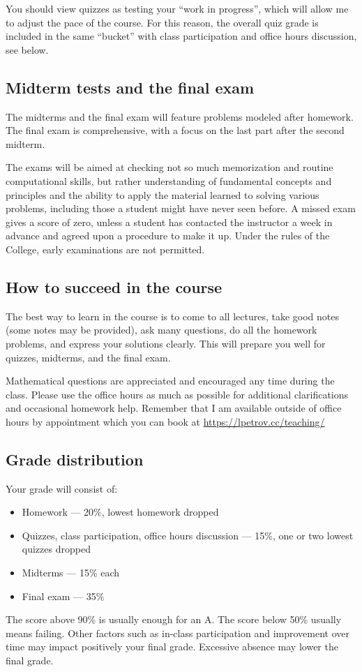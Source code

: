 \documentclass[oneside,11pt]{amsart}
\begin{document}
You should view quizzes as testing your “work in progress”,
which will allow me to adjust the pace of the course.
For this reason, the overall quiz grade is 
included in the same “bucket” with class participation and 
office hours discussion, see below.

\subsection{Midterm tests and the final exam}

The midterms and the final exam will feature
problems modeled after homework.
The final exam is comprehensive, with a focus on the last part
after the second midterm.

The exams will be aimed at checking not so much memorization and
routine computational skills, but rather understanding of fundamental
concepts and principles and the ability to apply the material
learned to solving various problems, including those a student might
have never seen before. A missed exam gives a score of zero, unless a
student has contacted the instructor a week in advance and agreed upon a
procedure to make it up. Under the rules of
the College, early examinations are not permitted.

\subsection{How to succeed in the course}

The best way to learn in the course is to come to all lectures, take good notes
(some notes may be provided),
ask many questions,
do all the homework problems, and express your solutions
clearly.
This will prepare you well for quizzes, midterms, and the final exam.

Mathematical questions are appreciated and encouraged any time during the
class. Please use the office hours as much as possible for additional
clarifications and occasional homework help. Remember that I am available outside 
of office hours by appointment which you can book at
\url{https://lpetrov.cc/teaching/}

\subsection{Grade distribution}

Your grade will consist of:
\begin{itemize}
	\item Homework --- 20\%, lowest homework dropped
	\item Quizzes, class participation, office hours discussion --- 15\%, one or two lowest quizzes dropped
	\item Midterms --- 15\% each
	\item Final exam --- 35\%
\end{itemize}
The score above 90\% is usually enough for an A.
The score below 50\% usually means failing.
Other factors such as in-class participation
and improvement over time may impact positively your final grade.
Excessive absence may lower the final grade.
\end{document}

